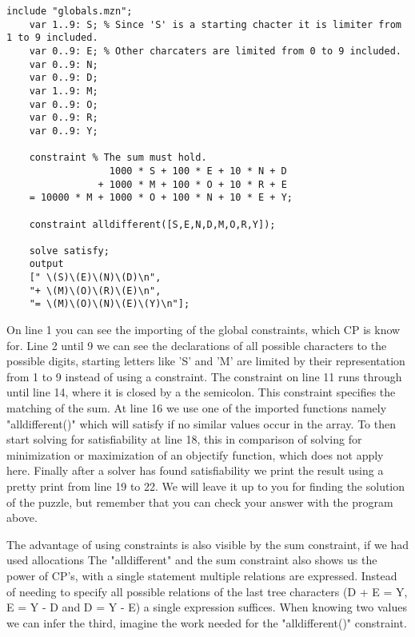 \label{lst:SendMoreMoney}
\begin{lstlisting}[language=minizinc, caption={Solution to "send + more = money" slightly modified from \url{https://www.minizinc.org/doc-2.5.5/en/downloads/send-more-money.mzn}}]
	include "globals.mzn";
	var 1..9: S; % Since 'S' is a starting chacter it is limiter from 1 to 9 included.
	var 0..9: E; % Other charcaters are limited from 0 to 9 included.
	var 0..9: N;
	var 0..9: D;
	var 1..9: M;
	var 0..9: O;
	var 0..9: R;
	var 0..9: Y;
	
	constraint % The sum must hold.
	              1000 * S + 100 * E + 10 * N + D
	            + 1000 * M + 100 * O + 10 * R + E
	= 10000 * M + 1000 * O + 100 * N + 10 * E + Y;
	
	constraint alldifferent([S,E,N,D,M,O,R,Y]);
	
	solve satisfy;
	output 
	[" \(S)\(E)\(N)\(D)\n",
	"+ \(M)\(O)\(R)\(E)\n",
	"= \(M)\(O)\(N)\(E)\(Y)\n"];
\end{lstlisting}
\label{sendMoreMoneyExplanation}
On line 1 you can see the importing of the global constraints, which CP is know for. Line 2 until 9 we can see the declarations of all possible characters to the possible digits, starting letters like 'S' and 'M' are limited by their representation from 1 to 9 instead of using a constraint. The constraint on line 11 runs through until line 14, where it is closed by a the semicolon. This constraint specifies the matching of the sum. At line 16 we use one of the imported functions namely "alldifferent()" which will satisfy if no similar values occur in the array. To then start solving for satisfiability at line 18, this in comparison of solving for minimization or maximization of an objectify function, which does not apply here. Finally after a solver has found satisfiability we print the result using a pretty print from line 19 to 22. We will leave it up to you for finding the solution of the puzzle, but remember that you can check your answer with the program above.

The advantage of using constraints is also visible by the sum constraint, if we had used allocations 
The "alldifferent" and the sum constraint also shows us the power of CP's, with a single statement multiple relations are expressed\cite{53marriott1998programming}. Instead of needing to specify all possible relations of the last tree characters (D + E = Y, E = Y - D and D = Y - E) a single expression suffices. When knowing two values we can infer the third, imagine the work needed for the "alldifferent()" constraint. 

